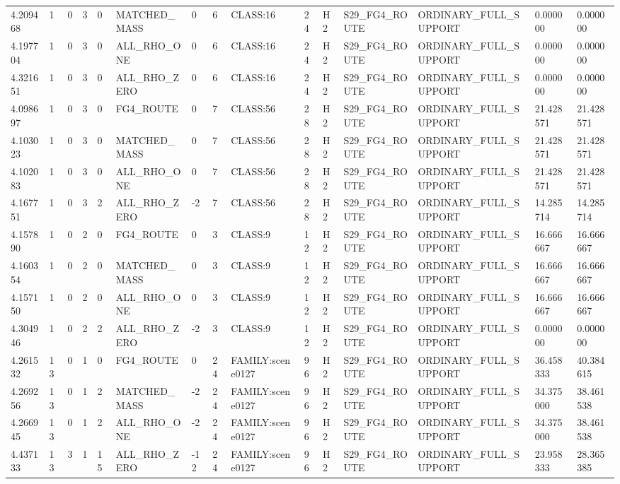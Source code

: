 \begin{tabular}{lllllllllllllll}
4.209468 & 1 & 0 & 3 & 0 & MATCHED\_MASS & 0 & 6 & CLASS:16 & 24 & H2 & S29\_FG4\_ROUTE & ORDINARY\_FULL\_SUPPORT & 0.000000 & 0.000000 \\
4.197704 & 1 & 0 & 3 & 0 & ALL\_RHO\_ONE & 0 & 6 & CLASS:16 & 24 & H2 & S29\_FG4\_ROUTE & ORDINARY\_FULL\_SUPPORT & 0.000000 & 0.000000 \\
4.321651 & 1 & 0 & 3 & 0 & ALL\_RHO\_ZERO & 0 & 6 & CLASS:16 & 24 & H2 & S29\_FG4\_ROUTE & ORDINARY\_FULL\_SUPPORT & 0.000000 & 0.000000 \\
4.098697 & 1 & 0 & 3 & 0 & FG4\_ROUTE & 0 & 7 & CLASS:56 & 28 & H2 & S29\_FG4\_ROUTE & ORDINARY\_FULL\_SUPPORT & 21.428571 & 21.428571 \\
4.103023 & 1 & 0 & 3 & 0 & MATCHED\_MASS & 0 & 7 & CLASS:56 & 28 & H2 & S29\_FG4\_ROUTE & ORDINARY\_FULL\_SUPPORT & 21.428571 & 21.428571 \\
4.102083 & 1 & 0 & 3 & 0 & ALL\_RHO\_ONE & 0 & 7 & CLASS:56 & 28 & H2 & S29\_FG4\_ROUTE & ORDINARY\_FULL\_SUPPORT & 21.428571 & 21.428571 \\
4.167751 & 1 & 0 & 3 & 2 & ALL\_RHO\_ZERO & -2 & 7 & CLASS:56 & 28 & H2 & S29\_FG4\_ROUTE & ORDINARY\_FULL\_SUPPORT & 14.285714 & 14.285714 \\
4.157890 & 1 & 0 & 2 & 0 & FG4\_ROUTE & 0 & 3 & CLASS:9 & 12 & H2 & S29\_FG4\_ROUTE & ORDINARY\_FULL\_SUPPORT & 16.666667 & 16.666667 \\
4.160354 & 1 & 0 & 2 & 0 & MATCHED\_MASS & 0 & 3 & CLASS:9 & 12 & H2 & S29\_FG4\_ROUTE & ORDINARY\_FULL\_SUPPORT & 16.666667 & 16.666667 \\
4.157150 & 1 & 0 & 2 & 0 & ALL\_RHO\_ONE & 0 & 3 & CLASS:9 & 12 & H2 & S29\_FG4\_ROUTE & ORDINARY\_FULL\_SUPPORT & 16.666667 & 16.666667 \\
4.304946 & 1 & 0 & 2 & 2 & ALL\_RHO\_ZERO & -2 & 3 & CLASS:9 & 12 & H2 & S29\_FG4\_ROUTE & ORDINARY\_FULL\_SUPPORT & 0.000000 & 0.000000 \\
4.261532 & 13 & 0 & 1 & 0 & FG4\_ROUTE & 0 & 24 & FAMILY:scene0127 & 96 & H2 & S29\_FG4\_ROUTE & ORDINARY\_FULL\_SUPPORT & 36.458333 & 40.384615 \\
4.269256 & 13 & 0 & 1 & 2 & MATCHED\_MASS & -2 & 24 & FAMILY:scene0127 & 96 & H2 & S29\_FG4\_ROUTE & ORDINARY\_FULL\_SUPPORT & 34.375000 & 38.461538 \\
4.266945 & 13 & 0 & 1 & 2 & ALL\_RHO\_ONE & -2 & 24 & FAMILY:scene0127 & 96 & H2 & S29\_FG4\_ROUTE & ORDINARY\_FULL\_SUPPORT & 34.375000 & 38.461538 \\
4.437133 & 13 & 3 & 1 & 15 & ALL\_RHO\_ZERO & -12 & 24 & FAMILY:scene0127 & 96 & H2 & S29\_FG4\_ROUTE & ORDINARY\_FULL\_SUPPORT & 23.958333 & 28.365385 \\

\end{tabular}
